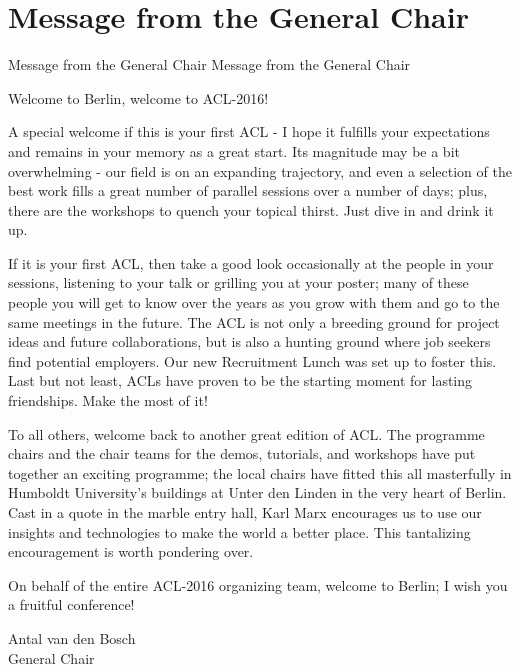 \section{Message from the General Chair}\vspace{2em}
\setheaders%
    {Message from the General Chair}%
    {Message from the General Chair}
\thispagestyle{emptyheader}

\setlength{\parskip}{1ex}

Welcome to Berlin, welcome to ACL-2016!

A special welcome if this is your first ACL -  I hope it fulfills your expectations and remains in your memory as a great start. Its magnitude may be a bit overwhelming - our field is on an expanding trajectory, and even a selection of the best work fills a great number of parallel sessions over a number of days; plus, there are the workshops to quench your topical thirst. Just dive in and drink it up.

If it is your first ACL, then take a good look occasionally at the people in your sessions, listening to your talk or grilling you at your poster; many of these people you will get to know over the years as you grow with them and go to the same meetings in the future. The ACL is not only a breeding ground for project ideas and future collaborations, but is also a hunting ground where job seekers find potential employers. Our new Recruitment Lunch was set up to foster this. Last but not least, ACLs have proven to be the starting moment for lasting friendships. Make the most of it!

To all others, welcome back to another great edition of ACL. The programme chairs and the chair teams for the demos, tutorials, and workshops have put together an exciting programme; the local chairs have fitted this all masterfully in Humboldt University’s buildings at Unter den Linden in the very heart of Berlin. Cast in a quote in the marble entry hall, Karl Marx encourages us to use our insights and technologies to make the world a better place. This tantalizing encouragement is worth pondering over.

On behalf of the entire ACL-2016 organizing team, welcome to Berlin; I wish you a fruitful conference!

\vskip 0.2in
\noindent Antal van den Bosch\\
General Chair


